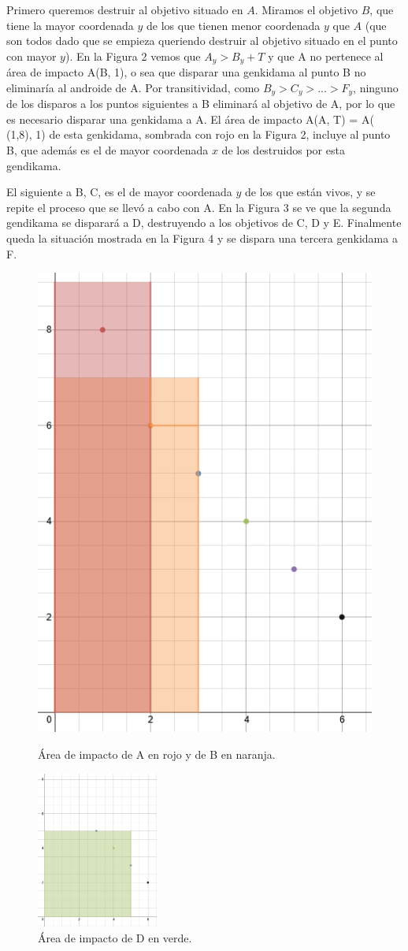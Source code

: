 \documentclass[10pt,a4paper]{article}
\begin{document}
Primero queremos destruir al objetivo situado en $A$. Miramos el objetivo $B$, que tiene la mayor coordenada $y$ de los que tienen menor coordenada $y$ que $A$ (que son todos dado que se empieza queriendo destruir al objetivo situado en el punto con mayor $y$). En la Figura 2 vemos que $A_{y} > B_{y} + T$ y que A no pertenece al área de impacto A(B, 1), o sea que disparar una genkidama al punto B no eliminaría al androide de A. Por transitividad, como $B_{y} > C_{y} > ... > F_{y}$, ninguno de los disparos a los puntos siguientes a B eliminará al objetivo de A, por lo que es necesario disparar una genkidama a A. El área de impacto A(A, T) = A( (1,8), 1) de esta genkidama, sombrada con rojo en la Figura 2, incluye al punto B, que además es el de mayor coordenada $x$ de los destruidos por esta gendikama.\\
\par{El siguiente a B, C, es el de mayor coordenada $y$ de los que están vivos, y se repite el proceso que se llevó a cabo con A. En la Figura 3 se ve que la segunda gendikama se disparará a D, destruyendo a los objetivos de C, D y E.
Finalmente queda la situación mostrada en la Figura 4 y se dispara una tercera genkidama a F.}\\

\begin{figure}[h!]
\centering
\begin{minipage}{.5\textwidth}
  \centering
  \includegraphics[width=.4\linewidth]{EjemploArea1}
  \caption{Área de impacto de A en rojo y de B en naranja.}
  \label{fig:test1}
\end{minipage}%
\begin{minipage}{.5\textwidth}
  \centering
  \includegraphics[width=4cm]{EjemploArea2}
  \caption{Área de impacto de D en verde.}
  \label{fig:test2}
\end{minipage}

\end{figure}
\end{document}
